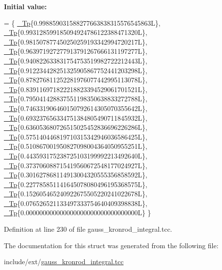 {\bfseries Initial value\+:}
\begin{DoxyCode}
=
      \{
        \hyperlink{namespace____gnu__cxx_a3b19a9c800ca194374ef9172290f7d79}{\_Tp}\{0.998859031588277663838315576545863L\},
        \hyperlink{namespace____gnu__cxx_a3b19a9c800ca194374ef9172290f7d79}{\_Tp}\{0.993128599185094924786122388471320L\},
        \hyperlink{namespace____gnu__cxx_a3b19a9c800ca194374ef9172290f7d79}{\_Tp}\{0.981507877450250259193342994720217L\},
        \hyperlink{namespace____gnu__cxx_a3b19a9c800ca194374ef9172290f7d79}{\_Tp}\{0.963971927277913791267666131197277L\},
        \hyperlink{namespace____gnu__cxx_a3b19a9c800ca194374ef9172290f7d79}{\_Tp}\{0.940822633831754753519982722212443L\},
        \hyperlink{namespace____gnu__cxx_a3b19a9c800ca194374ef9172290f7d79}{\_Tp}\{0.912234428251325905867752441203298L\},
        \hyperlink{namespace____gnu__cxx_a3b19a9c800ca194374ef9172290f7d79}{\_Tp}\{0.878276811252281976077442995113078L\},
        \hyperlink{namespace____gnu__cxx_a3b19a9c800ca194374ef9172290f7d79}{\_Tp}\{0.839116971822218823394529061701521L\},
        \hyperlink{namespace____gnu__cxx_a3b19a9c800ca194374ef9172290f7d79}{\_Tp}\{0.795041428837551198350638833272788L\},
        \hyperlink{namespace____gnu__cxx_a3b19a9c800ca194374ef9172290f7d79}{\_Tp}\{0.746331906460150792614305070355642L\},
        \hyperlink{namespace____gnu__cxx_a3b19a9c800ca194374ef9172290f7d79}{\_Tp}\{0.693237656334751384805490711845932L\},
        \hyperlink{namespace____gnu__cxx_a3b19a9c800ca194374ef9172290f7d79}{\_Tp}\{0.636053680726515025452836696226286L\},
        \hyperlink{namespace____gnu__cxx_a3b19a9c800ca194374ef9172290f7d79}{\_Tp}\{0.575140446819710315342946036586425L\},
        \hyperlink{namespace____gnu__cxx_a3b19a9c800ca194374ef9172290f7d79}{\_Tp}\{0.510867001950827098004364050955251L\},
        \hyperlink{namespace____gnu__cxx_a3b19a9c800ca194374ef9172290f7d79}{\_Tp}\{0.443593175238725103199992213492640L\},
        \hyperlink{namespace____gnu__cxx_a3b19a9c800ca194374ef9172290f7d79}{\_Tp}\{0.373706088715419560672548177024927L\},
        \hyperlink{namespace____gnu__cxx_a3b19a9c800ca194374ef9172290f7d79}{\_Tp}\{0.301627868114913004320555356858592L\},
        \hyperlink{namespace____gnu__cxx_a3b19a9c800ca194374ef9172290f7d79}{\_Tp}\{0.227785851141645078080496195368575L\},
        \hyperlink{namespace____gnu__cxx_a3b19a9c800ca194374ef9172290f7d79}{\_Tp}\{0.152605465240922675505220241022678L\},
        \hyperlink{namespace____gnu__cxx_a3b19a9c800ca194374ef9172290f7d79}{\_Tp}\{0.076526521133497333754640409398838L\},
        \hyperlink{namespace____gnu__cxx_a3b19a9c800ca194374ef9172290f7d79}{\_Tp}\{0.000000000000000000000000000000000L\}
      \}
\end{DoxyCode}


Definition at line 230 of file gauss\+\_\+kronrod\+\_\+integral.\+tcc.



The documentation for this struct was generated from the following file\+:\begin{DoxyCompactItemize}
\item 
include/ext/\hyperlink{gauss__kronrod__integral_8tcc}{gauss\+\_\+kronrod\+\_\+integral.\+tcc}\end{DoxyCompactItemize}
